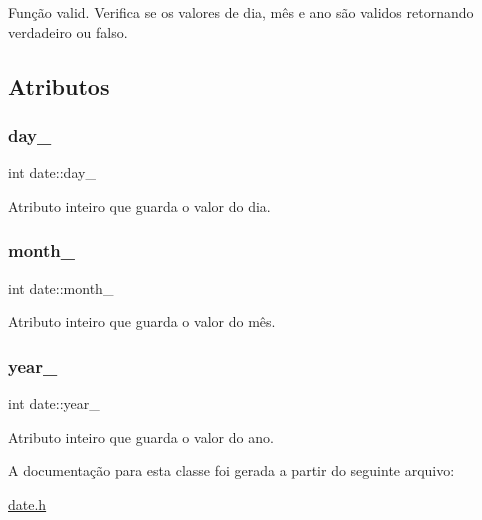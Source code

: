 Função valid. Verifica se os valores de dia, mês e ano são validos retornando verdadeiro ou falso. 

\subsection{Atributos}
\mbox{\label{classdate_a8b6a07e98bfbaae3970841ec1d1854b8}} 
\subsubsection{\texorpdfstring{day\+\_\+}{day\_}}
{\footnotesize\ttfamily int date\+::day\+\_\+\hspace{0.3cm}{\ttfamily [protected]}}

Atributo inteiro que guarda o valor do dia. \mbox{\label{classdate_a71822c3ffdc179d9592449ddcc25af90}} 
\subsubsection{\texorpdfstring{month\+\_\+}{month\_}}
{\footnotesize\ttfamily int date\+::month\+\_\+\hspace{0.3cm}{\ttfamily [protected]}}

Atributo inteiro que guarda o valor do mês. \mbox{\label{classdate_ae61f71866a55ae344f9dcde1bd25b214}} 
\subsubsection{\texorpdfstring{year\+\_\+}{year\_}}
{\footnotesize\ttfamily int date\+::year\+\_\+\hspace{0.3cm}{\ttfamily [protected]}}

Atributo inteiro que guarda o valor do ano. 

A documentação para esta classe foi gerada a partir do seguinte arquivo\+:\begin{DoxyCompactItemize}
\item 
\hyperlink{date_8h}{date.\+h}\end{DoxyCompactItemize}

